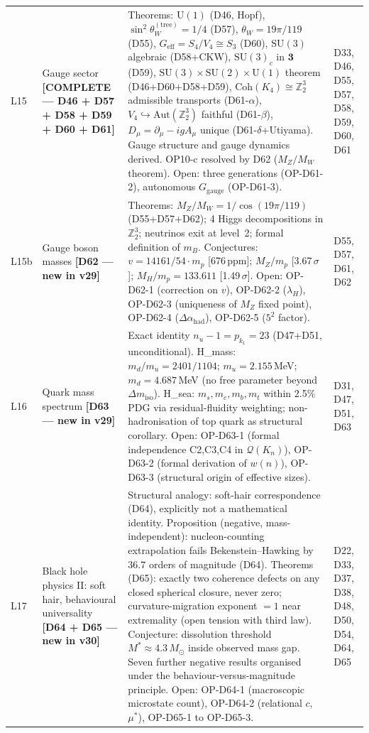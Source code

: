 \documentclass[11pt,a4paper]{article}
\theoremstyle{plain}
\theoremstyle{definition}
\theoremstyle{remark}
\newcommand{\Uone}{\mathrm{U}(1)}
\newcommand{\SUtwo}{\mathrm{SU}(2)}
\newcommand{\SUthree}{\mathrm{SU}(3)}
\newcommand{\Coh}{\mathrm{Coh}(K_4)}
\begin{document}
\begin{longtable}{L{0.6cm}L{3.0cm}L{5.5cm}L{4.0cm}}
L15 & Gauge sector \textbf{[COMPLETE --- D46 + D57 + D58 + D59 + D60 + D61]} & \textcolor{proofblue}{Theorems}: $\Uone$ (D46, Hopf), $\sin^2\theta_W^{(\mathrm{tree})}=1/4$ (D57), $\theta_W=19\pi/119$ (D55), $G_{\mathrm{eff}}=S_4/V_4\cong S_3$ (D60), $\SUthree$ algebraic (D58+CKW), $\SUthree_c$ in $\mathbf{3}$ (D59), $\SUthree\times\SUtwo\times\Uone$ theorem (D46+D60+D58+D59), $\Coh\cong\mathbb{Z}_2^3$ admissible transports (D61-$\alpha$), $V_4\hookrightarrow\mathrm{Aut}(\mathbb{Z}_2^3)$ faithful (D61-$\beta$), $D_\mu=\partial_\mu-igA_\mu$ unique (D61-$\delta$+Utiyama). Gauge structure and gauge dynamics derived. OP10-c resolved by D62 ($M_Z/M_W$ theorem). Open: three generations (OP-D61-2), autonomous $G_{\mathrm{gauge}}$ (OP-D61-3). & D33, D46, D55, D57, D58, D59, D60, D61\\[0.3em]
L15b & Gauge boson masses \textbf{[D62 --- new in v29]} & \textcolor{proofblue}{Theorems}: $M_Z/M_W = 1/\cos(19\pi/119)$ (D55+D57+D62); 4 Higgs decompositions in $\mathbb{Z}_2^3$; neutrinos exit at level~2; formal definition of $m_B$. \textcolor{conjecturegreen}{Conjectures}: $v = 14161/54\cdot m_p$ [676\,ppm]; $M_Z/m_p$ [3.67\,$\sigma$]; $M_H/m_p = 133.611$ [1.49\,$\sigma$]. Open: OP-D62-1 (correction on $v$), OP-D62-2 ($\lambda_H$), OP-D62-3 (uniqueness of $M_Z$ fixed point), OP-D62-4 ($\Delta\alpha_{\mathrm{had}}$), OP-D62-5 ($5^2$ factor). & D55, D57, D61, D62\\[0.3em]
L16 & Quark mass spectrum \textbf{[D63 --- new in v29]} & Exact identity $n_u - 1 = p_{k_1} = 23$ (D47+D51, \textcolor{proofblue}{unconditional}). \textcolor{conjecturegreen}{H\_mass}: $m_d/m_u = 2401/1104$; $m_u = 2.155$\,MeV; $m_d = 4.687$\,MeV (no free parameter beyond $\Delta m_{\mathrm{iso}}$). \textcolor{conjecturegreen}{H\_sea}: $m_s, m_c, m_b, m_t$ within 2.5\% PDG via residual-fluidity weighting; non-hadronisation of top quark as structural corollary. Open: OP-D63-1 (formal independence C2,C3,C4 in $\mathcal{Q}(K_n)$), OP-D63-2 (formal derivation of $w(n)$), OP-D63-3 (structural origin of effective sizes). & D31, D47, D51, D63\\[0.3em]
L17 & Black hole physics II: soft hair, behavioural universality \textbf{[D64 + D65 --- new in v30]} & \textcolor{conjecturegreen}{Structural analogy}: soft-hair correspondence (D64), explicitly not a mathematical identity. \textcolor{proofblue}{Proposition} (negative, mass-independent): nucleon-counting extrapolation fails Bekenstein--Hawking by $36.7$ orders of magnitude (D64). \textcolor{proofblue}{Theorems} (D65): exactly two coherence defects on any closed spherical closure, never zero; curvature-migration exponent $=1$ near extremality (open tension with third law). \textcolor{conjecturegreen}{Conjecture}: dissolution threshold $M^*\approx4.3\,M_\odot$ inside observed mass gap. Seven further negative results organised under the behaviour-versus-magnitude principle. Open: OP-D64-1 (macroscopic microstate count), OP-D64-2 (relational $c$, $\mu^*$), OP-D65-1 to OP-D65-3. & D22, D33, D37, D38, D48, D50, D54, D64, D65\\[0.3em]

\end{longtable}
\end{document}
